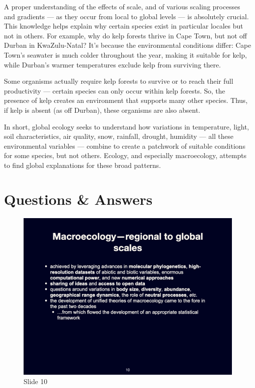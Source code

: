 \documentclass[
  12pt,
]{book}
\begin{document}
A proper understanding of the effects of scale, and of various scaling
processes and gradients --- as they occur from local to global levels
--- is absolutely crucial. This knowledge helps explain why certain
species exist in particular locales but not in others. For example, why
do kelp forests thrive in Cape Town, but not off Durban in
KwaZulu-Natal? It's because the environmental conditions differ: Cape
Town's seawater is much colder throughout the year, making it suitable
for kelp, while Durban's warmer temperatures exclude kelp from surviving
there.

Some organisms actually require kelp forests to survive or to reach
their full productivity --- certain species can only occur within kelp
forests. So, the presence of kelp creates an environment that supports
many other species. Thus, if kelp is absent (as off Durban), these
organisms are also absent.

In short, global ecology seeks to understand how variations in
temperature, light, soil characteristics, air quality, snow, rainfall,
drought, humidity --- all these environmental variables --- combine to
create a patchwork of suitable conditions for some species, but not
others. Ecology, and especially macroecology, attempts to find global
explanations for these broad patterns.

\section{Questions \& Answers}\label{questions-answers-1}

\begin{figure}[ht]
\centering
\includegraphics[width=0.8\linewidth]{../images/BDC334/BDC334-010.jpeg}
\caption*{Slide 10}
\end{figure}
\end{document}

